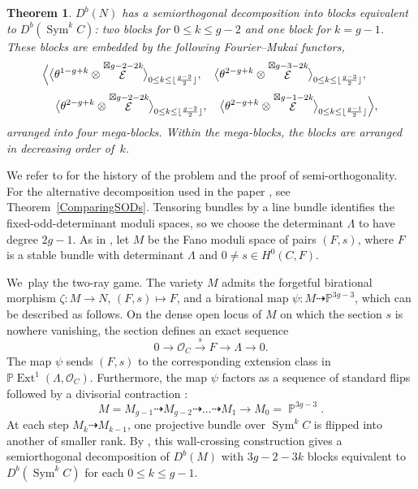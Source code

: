 \documentclass[11pt,letterpaper]{amsart}
\theoremstyle{plain}
\newtheorem{theorem}{Theorem}[section]
\theoremstyle{definition}
\theoremstyle{remark}
\numberwithin{equation}{section}
\DeclareMathOperator{\Ext}{Ext}
\DeclareMathOperator{\Sym}{Sym}
\DeclareMathOperator{\cE}{\mathcal{E}}
\DeclareMathOperator{\bP}{{\mathbb{P}}}
\begin{document}
 
\begin{theorem}\label{MainTheorem}
$D^b(N)$ has a semiorthogonal decomposition into blocks equivalent to
$D^b(\operatorname{Sym}^kC)$: two blocks for $0\le k\le g-2$ and one
block for $k=g-1$. These blocks are
embedded by the following Fourier--Mukai functors,
$$
\Bigl\langle
\bigl\langle 
{\theta}^{1-g+k}\otimes\cE^{\boxtimes g-2-2k}
\bigr\rangle_{0\le k\le \lfloor{g-2\over2}\rfloor},\quad
\bigl\langle 
{\theta}^{2-g+k}\otimes\cE^{\boxtimes g-3-2k}
\bigr\rangle_{0\le k\le  \lfloor{g-3\over2}\rfloor},\quad{}$$
$${}\quad\bigl\langle 
{\theta}^{2-g+k}\otimes\cE^{\boxtimes g-2-2k}
\bigr\rangle_{0\le k\le \lfloor{g-2\over2}\rfloor},
\quad \bigl\langle 
{\theta}^{2-g+k}\otimes\cE^{\boxtimes g-1-2k}
\bigr\rangle_{0\le k\le  \lfloor{g-1\over2}\rfloor}
\Bigr\rangle,
$$ 
arranged into four mega-blocks.
Within the mega-blocks, the 
blocks are arranged in decreasing order of~$k$.
\end{theorem}



We refer to \cite{TT} for the history of the problem and the proof of semi-orthogonality. 
For the alternative decomposition
used in the paper \cite{TT}, see Theorem~\ref{ComparingSODs}.
Tensoring bundles by a line bundle identifies the fixed-odd-determinant
moduli spaces, so we  choose the determinant $\Lambda$ to have
degree $2g-1$. As in \cite{TT}, let $M$ be the Fano moduli space of pairs
$(F,s)$, where $F$ is a stable bundle with determinant $\Lambda$ and
$0\ne s\in H^0(C,F)$. 


We~play the two-ray game. The variety $M$ admits the forgetful birational morphism
$\zeta:M\to N$, $(F,s)\mapsto F$, and a birational map
$\psi:M\dashrightarrow\mathbb P^{3g-3}$, which can be described as follows.  On the dense open locus of $M$ on which
the section $s$ is nowhere vanishing, the section defines an exact sequence
\[
0\longrightarrow\mathcal O_C\xrightarrow{s}F\longrightarrow\Lambda
\longrightarrow0.
\]
The map $\psi$ sends $(F,s)$ to the corresponding extension class in
$\mathbb P\Ext^1(\Lambda,\mathcal O_C)$.
Furthermore, 
the map $\psi$ factors as a sequence of standard flips followed by a divisorial contraction \cite{thaddeus}:
\begin{equation}\label{THDiagram}
M=M_{g-1}\dashrightarrow M_{g-2}\dashrightarrow\ldots\dashrightarrow M_1\to M_0=\bP^{3g-3}.
\end{equation}
At each step $M_k\dashrightarrow M_{k-1}$, one projective bundle over $\Sym^kC$ is flipped into another of smaller rank.
By \cite[Proposition~3.18]{TT}, this wall-crossing construction gives a
semiorthogonal decomposition of $D^b(M)$ with $3g-2-3k$ blocks equivalent
to $D^b(\Sym^kC)$ for each $0\le k\le g-1$. 
 
\end{document}
